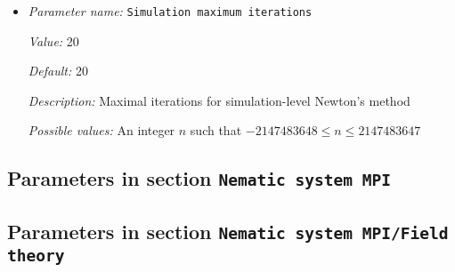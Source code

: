 \begin{itemize}
{\it Value:} 1.0


{\it Default:} 1.0


{\it Description:} Step size for each update to Newton's method


{\it Possible values:} A floating point number $v$ such that $-\text{MAX\_DOUBLE} \leq v \leq \text{MAX\_DOUBLE}$
\item {\it Parameter name:} {\tt Simulation maximum iterations}
\label{parameters:NematicSystemMPIDriver/Simulation/Simulation maximum iterations}
\label{parameters:NematicSystemMPIDriver/Simulation/Simulation_20maximum_20iterations}


{\it Value:} 20


{\it Default:} 20


{\it Description:} Maximal iterations for simulation-level Newton's method


{\it Possible values:} An integer $n$ such that $-2147483648\leq n \leq 2147483647$
\end{itemize}

\subsection{Parameters in section \tt Nematic system MPI}
\label{parameters:Nematic_20system_20MPI}


\subsection{Parameters in section \tt Nematic system MPI/Field theory}
\label{parameters:Nematic_20system_20MPI/Field_20theory}

